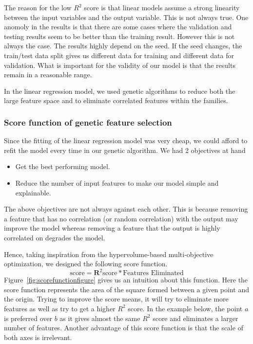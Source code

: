 \documentclass[11pt]{article}
\begin{document}
The reason for the low $R^2$ score is that linear models assume a strong linearity between the input variables and the output variable.
This is not always true.
One anomoly in the results is that there are some cases where the validation and testing results seem to be better than the training result.
However this is not always the case. 
The results highly depend on the seed.
If the seed changes,  the train/test data split gives us different data for training and different data for validation.
What is important for the validity of our model is that the results remain in a reasonable range.

In the linear regression model,  we used genetic algorithms to reduce both the large feature space and to eliminate correlated features within the families. 

\subsubsection{Score function of genetic feature selection}
\label{GenerationScoringFunction}
Since the fitting of the linear regression model was very cheap, we could afford to refit the model every time in our genetic algorithm.
We had 2 objectives at hand
\begin{itemize}
\item Get the best performing model.
\item Reduce the number of input features to make our model simple and explainable.
\end{itemize}
The above objectives are not always against each other.
This is because removing a feature that has no correlation (or random correlation) with the output may improve the model whereas removing a feature that the output is highly correlated on degrades the model.

Hence,  taking inspiration from the hypervolume-based multi-objective optimization, we designed the following score function.
$$
\textrm{score} = \mathbf{R}^2 \textrm{score} * \textrm{Features Eliminated}
$$
Figure~\ref{fig:scorefunctionfigure} gives us an intuition about this function.
Here the score function represents the area of the square formed between a given point and the origin.
Trying to improve the score means,  it will try to eliminate more features as well as try to get a higher $R^2$ score.
In the example below,  the point $a$ is preferred over $b$ as it gives almost the same $R^2$ score and eliminates a larger number of features.
Another advantage of this score function is that the scale of both axes is irrelevant.
\end{document}
